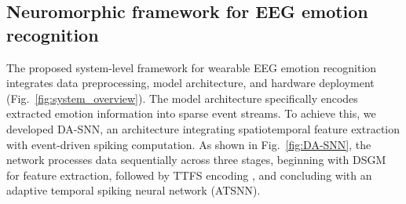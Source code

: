 \documentclass{nsr}
\begin{document}
\subsection{Neuromorphic framework for EEG emotion recognition}

The proposed system-level framework for wearable EEG emotion recognition integrates data preprocessing, model architecture, and hardware deployment (Fig.~\ref{fig:system_overview}). The model architecture specifically encodes extracted emotion information into sparse event streams. To achieve this, we developed DA-SNN, an architecture integrating spatiotemporal feature extraction with event-driven spiking computation. As shown in Fig.~\ref{fig:DA-SNN}, the network processes data sequentially across three stages, beginning with DSGM for feature extraction, followed by TTFS encoding \cite{TTFS}, and concluding with an adaptive temporal spiking neural network (ATSNN).
\end{document}
